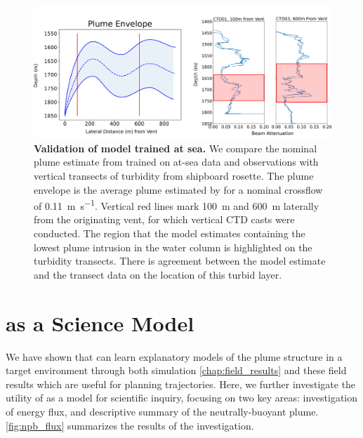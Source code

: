 \begin{figure}[h!]
    \centering
    \includegraphics[width=1\columnwidth]{figures/field_validation.png}
    \caption[Validation of \PHUMES model trained at sea.]{\textbf{Validation of \PHUMES model trained at sea.} We compare the nominal plume estimate from \PHUMES trained on at-sea data and \Sentry observations with vertical transects of turbidity from shipboard rosette. The plume envelope is the average plume estimated by \PHUMES for a nominal crossflow of \SI{0.11}{\meter\per\second}. Vertical red lines mark \SI{100}{\meter} and \SI{600}{\meter} laterally from the originating vent, for which vertical CTD casts were conducted. The region that the model estimates containing the lowest plume intrusion in the water column is highlighted on the turbidity transects. There is agreement between the model estimate and the transect data on the location of this turbid layer.} 
    \label{fig:field_valid}
\end{figure}

\section{\PHUMES as a Science Model}
\label{sec:phumes_as_science}
We have shown that \PHUMES can learn explanatory models of the plume structure in a target environment through both simulation \cref{chap:field_results} and these field results which are useful for planning \PHORTEX trajectories. Here, we further investigate the utility of \PHUMES as a model for scientific inquiry, focusing on two key areas: investigation of energy flux, and descriptive summary of the neutrally-buoyant plume. \cref{fig:npb_flux} summarizes the results of the investigation.

